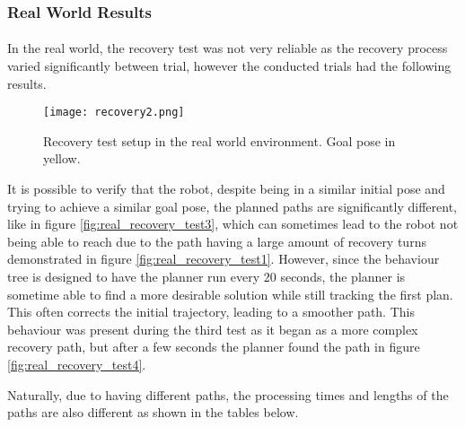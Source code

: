 \clearpage

\subsubsection{Real World Results}

\paragraph{}In the real world, the recovery test was not very reliable as the recovery 
process varied significantly between trial, however the conducted trials had the 
following results.

\begin{figure}[h]
    \centering
    \texttt{[image: recovery2.png]}
    \caption{Recovery test setup in the real world environment. Goal pose in yellow.}
    \label{fig:real_recovery_test2}
\end{figure}

It is possible to verify that the robot, despite being in a similar initial pose 
and trying to achieve a similar goal pose, the planned paths are significantly different, like in figure \ref{fig:real_recovery_test3}, which 
can sometimes lead to the robot not being able to reach due to the path 
having a large amount of recovery turns demonstrated in figure \ref{fig:real_recovery_test1}. However, since the behaviour tree is 
designed to have the planner run every 20 seconds, the planner is sometime able to 
find a more desirable solution while still tracking the first plan. This often 
corrects the initial trajectory, leading to a smoother path. This behaviour was present 
during the third test as it began as a more complex recovery path, but after 
a few seconds the planner found the path in figure \ref{fig:real_recovery_test4}.

Naturally, due to having different paths, the processing times and 
lengths of the paths are also different as shown in the tables below.

